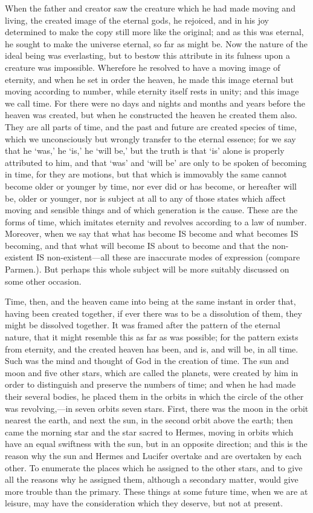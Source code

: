 When the father and creator saw the creature which he had made moving and
living, the created image of the eternal gods, he rejoiced, and in his joy
determined to make the copy still more like the original; and as this was
eternal, he sought to make the universe eternal, so far as might be. Now
the nature of the ideal being was everlasting, but to bestow this
attribute in its fulness upon a creature was impossible. Wherefore he
resolved to have a moving image of eternity, and when he set in order the
heaven, he made this image eternal but moving according to number, while
eternity itself rests in unity; and this image we call time. For there
were no days and nights and months and years before the heaven was
created, but when he constructed the heaven he created them also. They are
all parts of time, and the past and future are created species of time,
which we unconsciously but wrongly transfer to the eternal essence; for we
say that he ‘was,’ he ‘is,’ he ‘will be,’ but the truth is that ‘is’ alone
is properly attributed to him, and that ‘was’ and ‘will be’ are only to be
spoken of becoming in time, for they are motions, but that which is
immovably the same cannot become older or younger by time, nor ever did or
has become, or hereafter will be, older or younger, nor is subject at all
to any of those states which affect moving and sensible things and of
which generation is the cause. These are the forms of time, which imitates
eternity and revolves according to a law of number. Moreover, when we say
that what has become IS become and what becomes IS becoming, and that what
will become IS about to become and that the non-existent IS non-existent—all
these are inaccurate modes of expression (compare Parmen.). But perhaps
this whole subject will be more suitably discussed on some other occasion.

Time, then, and the heaven came into being at the same instant in order
that, having been created together, if ever there was to be a dissolution
of them, they might be dissolved together. It was framed after the pattern
of the eternal nature, that it might resemble this as far as was possible;
for the pattern exists from eternity, and the created heaven has been, and
is, and will be, in all time. Such was the mind and thought of God in the
creation of time. The sun and moon and five other stars, which are called
the planets, were created by him in order to distinguish and preserve the
numbers of time; and when he had made their several bodies, he placed them
in the orbits in which the circle of the other was revolving,—in
seven orbits seven stars. First, there was the moon in the orbit nearest
the earth, and next the sun, in the second orbit above the earth; then
came the morning star and the star sacred to Hermes, moving in orbits
which have an equal swiftness with the sun, but in an opposite direction;
and this is the reason why the sun and Hermes and Lucifer overtake and are
overtaken by each other. To enumerate the places which he assigned to the
other stars, and to give all the reasons why he assigned them, although a
secondary matter, would give more trouble than the primary. These things
at some future time, when we are at leisure, may have the consideration
which they deserve, but not at present.


